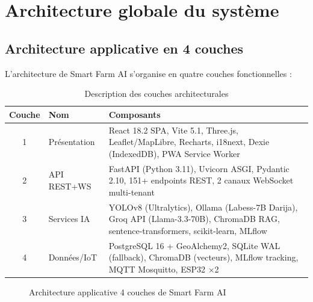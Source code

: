 \section{Architecture globale du système}

\subsection{Architecture applicative en 4 couches}

L'architecture de Smart Farm AI s'organise en quatre couches fonctionnelles :

\begin{table}[H]
\centering
\caption{Description des couches architecturales}
\label{tab:couches}
\begin{tabularx}{\linewidth}{clX}
\toprule
\textbf{Couche} & \textbf{Nom} & \textbf{Composants} \\
\midrule
1 & Présentation & React 18.2 SPA, Vite 5.1, Three.js, Leaflet/MapLibre,
                    Recharts, i18next, Dexie (IndexedDB), PWA Service Worker \\
2 & API REST+WS  & FastAPI (Python 3.11), Uvicorn ASGI, Pydantic 2.10,
                    151+ endpoints REST, 2 canaux WebSocket multi-tenant \\
3 & Services IA  & YOLOv8 (Ultralytics), Ollama (Labess-7B Darija),
                    Groq API (Llama-3.3-70B), ChromaDB RAG,
                    sentence-transformers, scikit-learn, MLflow \\
4 & Données/IoT  & PostgreSQL 16 + GeoAlchemy2, SQLite WAL (fallback),
                    ChromaDB (vecteurs), MLflow tracking,
                    MQTT Mosquitto, ESP32 ×2 \\
\bottomrule
\end{tabularx}
\end{table}

\begin{figure}[H]
\centering
{}
\caption{Architecture applicative 4 couches de Smart Farm AI}
\label{fig:archi_4couches}
\end{figure}

